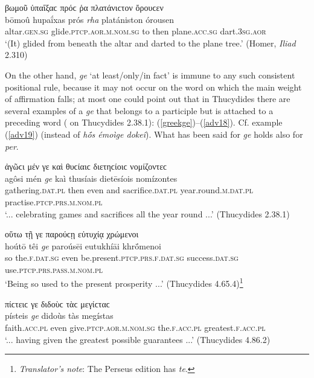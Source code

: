 \begin{exe}
\ex βωμοῦ ὑπαΐξαϲ πρόϲ ῥα πλατάνιϲτον ὄρουϲεν\\
\gll bōmoû hupaḯxas prós \emph{rha} platániston órousen\\
altar.\textsc{gen.sg} glide.\textsc{ptcp.aor.m.nom.sg} to then plane.\textsc{acc.sg} dart.\textsc{3sg.aor}\\
\trans `(It) glided from beneath the altar and darted to the plane tree.' (Homer, \textit{Iliad} 2.310)
\label{adv16}
\end{exe}

On the other hand, \textit{ge} `at least/only/in fact' is immune to any such consistent positional rule, because it may not occur on the word on which the main weight of affirmation falls; at most one could point out that in Thucydides there are several examples of a \textit{ge} that belongs to a participle but is attached to a preceding word (\citealp[79]{PoppoStahl1889} on Thucydides 2.38.1): (\ref{greekge})--(\ref{adv18}). Cf. example (\ref{adv19}) (instead of \textit{hṓs émoìge dokeî}). What has been said for \textit{ge} holds also for \textit{per}.

\begin{exe}
\ex ἀγῶϲι μέν γε καὶ θυϲίαιϲ διετηϲίοιϲ νομίζοντεϲ\\
\gll agôsi mén \emph{ge} kaì thusíais dietēsíois nomízontes\\
gathering.\textsc{dat.pl} then even and sacrifice.\textsc{dat.pl}
year.round.\textsc{m.dat.pl} practise.\textsc{ptcp.prs.m.nom.pl}\\
\trans `... celebrating games and sacrifices all the year round ...' (Thucydides 2.38.1)
\label{greekge}
\end{exe}

\begin{exe}
\ex οὕτω τῇ γε παρούϲῃ εὐτυχίᾳ χρώμενοι\\
\gll hoútō têi \emph{ge} paroúsēi eutukhíāi khrṓmenoi\\
so the.\textsc{f.dat.sg} even be.present.\textsc{ptcp.prs.f.dat.sg}
success.\textsc{dat.sg} use.\textsc{ptcp.prs.pass.m.nom.pl}\\
\trans `Being so used to the present prosperity ...' (Thucydides 4.65.4)\footnote{\emph{Translator's note}: The Perseus edition has \textit{te}.}
\label{adv17}
\end{exe}

\begin{exe}
\ex πίϲτειϲ γε διδοὺϲ τὰϲ μεγίϲταϲ\\
\gll písteis \emph{ge} didoùs tàs megístas\\
faith.\textsc{acc.pl} even give.\textsc{ptcp.aor.m.nom.sg} the.\textsc{f.acc.pl} greatest.\textsc{f.acc.pl}\\
\trans `... having given the greatest possible guarantees ...' (Thucydides 4.86.2)
\label{adv18}
\end{exe}

